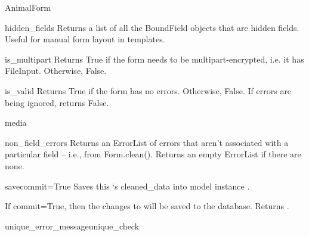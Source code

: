 \documentclass[letterpaper,10pt,english]{sphinxmanual}
\begin{document}
\begin{classdesc}{AnimalForm}
\hypertarget{animal.forms.AnimalForm.hidden_fields}{}\begin{methoddesc}[AnimalForm]{hidden\_fields}{}
Returns a list of all the BoundField objects that are hidden fields.
Useful for manual form layout in templates.
\end{methoddesc}

\hypertarget{animal.forms.AnimalForm.is_multipart}{}\begin{methoddesc}[AnimalForm]{is\_multipart}{}
Returns True if the form needs to be multipart-encrypted, i.e. it has
FileInput. Otherwise, False.
\end{methoddesc}

\hypertarget{animal.forms.AnimalForm.is_valid}{}\begin{methoddesc}[AnimalForm]{is\_valid}{}
Returns True if the form has no errors. Otherwise, False. If errors are
being ignored, returns False.
\end{methoddesc}

\hypertarget{animal.forms.AnimalForm.media}{}\begin{memberdesc}[AnimalForm]{media}\end{memberdesc}

\hypertarget{animal.forms.AnimalForm.non_field_errors}{}\begin{methoddesc}[AnimalForm]{non\_field\_errors}{}
Returns an ErrorList of errors that aren't associated with a particular
field -- i.e., from Form.clean(). Returns an empty ErrorList if there
are none.
\end{methoddesc}

\hypertarget{animal.forms.AnimalForm.save}{}\begin{methoddesc}[AnimalForm]{save}{commit=True}
Saves this `s cleaned\_data into model instance
.

If commit=True, then the changes to  will be saved to the
database. Returns .
\end{methoddesc}

\hypertarget{animal.forms.AnimalForm.unique_error_message}{}\begin{methoddesc}[AnimalForm]{unique\_error\_message}{unique\_check}\end{methoddesc}


\end{classdesc}
\end{document}
